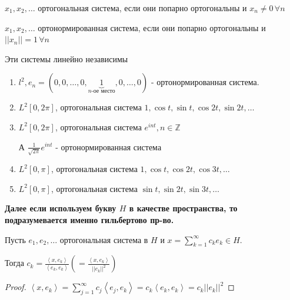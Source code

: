 \begin{definition}
    $x_1, x_2, \ldots$ ортогональная система, если они попарно ортогональны и $x_n \neq 0 \, \forall n$
\end{definition}

\begin{definition}
    $x_1, x_2, \ldots$ ортонормированная система, если они попарно ортогональны и $||x_n|| = 1 \, \forall n$
\end{definition}

\begin{remark}
    Эти системы линейно независимы
\end{remark}

\begin{example}
    \begin{enumerate}
        \item {
            $l^2, e_n = (0, 0, \ldots , 0, \underbrace{1}_{n \text{-ое место}}, 0, \ldots, 0)$ - ортонормированная система.
        }
        \item {
            $L^2 [0, 2\pi]$, ортогональная система $1, \cos t, \sin t, \cos 2t, \sin 2t, \ldots$
        }
        \item {
            $L^2 [0, 2\pi]$, ортогональная система $e^{int}, n \in \mathbb{Z}$

            А $\frac{1}{\sqrt{2\pi}} e^{int}$ - ортонормированная система
        }
        \item {
            $L^2 [0, \pi]$, ортогональная система $1, \cos t, \cos 2t, \cos 3t, \ldots$
        }
        \item {
            $L^2 [0, \pi]$, ортогональная система $\sin t, \sin 2t, \sin 3t, \ldots$
        }
    \end{enumerate}
\end{example}


\textbf{Далее если используем букву $H$ в качестве пространства, то подразумевается именно гильбертово пр-во.}

\begin{theorem}
    Пусть $e_1, e_2, \ldots$ ортогональная система в $H$ и $x = \sum_{k = 1}^\infty c_k e_k \in H$.

    Тогда $c_k = \frac{\left < x, e_k  \right >}{\left < e_k, e_k \right >} \left(= \frac{\left < x, e_k  \right >}{||e_k||^2} \right)$
\end{theorem}

\begin{proof}
    $\left < x, e_k \right > = \sum_{j = 1}^\infty c_j \left < e_j, e_k \right > = c_k \left < e_k , e_k \right > = c_k ||e_k||^2$
\end{proof}

